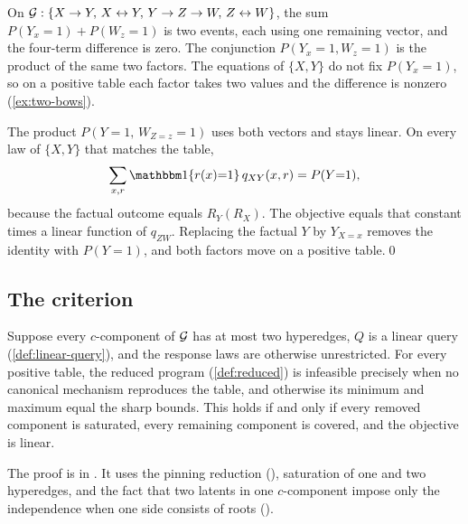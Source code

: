 \begin{example}
\label{ex:linearity}
On $\mathcal{G}:\{X\to Y,\, X\leftrightarrow Y,\, Y\to Z\to W,\, Z\leftrightarrow W\}$, the sum $P(Y_x{=}1)+P(W_z{=}1)$ is two events, each using one remaining vector, and the four-term difference is zero. The conjunction $P(Y_x{=}1,W_z{=}1)$ is the product of the same two factors. The equations of $\{X,Y\}$ do not fix $P(Y_x{=}1)$, so on a positive table each factor takes two values and the difference is nonzero (\cref{ex:two-bows}).

The product $P(Y{=}1,\,W_{Z=z}{=}1)$ uses both vectors and stays linear. On every law of $\{X,Y\}$ that matches the table,
\begin{equation}
\sum_{x,r}\I\{r(x){=}1\}\,q_{XY}(x,r)=P(Y{=}1),
\end{equation}
because the factual outcome equals $R_Y(R_X)$. The objective equals that constant times a linear function of $q_{ZW}$. Replacing the factual $Y$ by $Y_{X=x}$ removes the identity with $P(Y{=}1)$, and both factors move on a positive table.\qed
\end{example}

\subsection{The criterion}
\label{sec:criterion}

\begin{theorem}
\label{thm:lp}
Suppose every $c$-component of $\mathcal{G}$ has at most two hyperedges, $Q$ is a linear query (\cref{def:linear-query}), and the response laws are otherwise unrestricted. For every positive table, the reduced program (\cref{def:reduced}) is infeasible precisely when no canonical mechanism reproduces the table, and otherwise its minimum and maximum equal the sharp bounds. This holds if and only if every removed component is saturated, every remaining component is covered, and the objective is linear.
\end{theorem}

The proof is in . It uses the pinning reduction (), saturation of one and two hyperedges, and the fact that two latents in one $c$-component impose only the independence  when one side consists of roots ().

